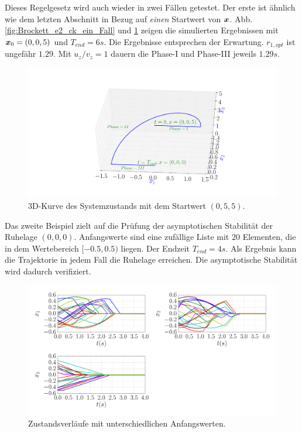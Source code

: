 Dieses Regelgesetz wird auch wieder in zwei Fällen getestet. Der erste ist ähnlich wie dem letzten Abschnitt in Bezug auf \emph{einen} Startwert von $\boldsymbol x$. Abb. \ref{fig:Brockett_e2_ck_ein_Fall} und \ref{fig:3d_Brockett_e2_ck} zeigen die simulierten Ergebnissen mit $\boldsymbol x_{0}=(0,0,5)$ und $T_{end}=6s$. Die Ergebnisse entsprechen der Erwartung. $r_{1,opt}$ ist ungefähr $1.29$. Mit $u_{z}/v_{z}=1$ dauern die Phase-I und Phase-III jeweils $1.29s$.
\begin{figure}[!h]
	\centering
	\includegraphics[width=0.8\linewidth]{bild/30_32/3d_Brockett_e2_ck.pdf}%
	\caption{3D-Kurve des Systemzustands mit dem Startwert $(0,5,5)$.}
	\label{fig:3d_Brockett_e2_ck}
\end{figure}

Das zweite Beispiel zielt auf die Prüfung der asymptotischen Stabilität der Ruhelage $(0,0,0)$. Anfangswerte sind eine zufällige Liste mit $20$ Elementen, die in dem Wertebereich $[-0.5,0.5)$ liegen. Der Endzeit $T_{end}=4s$. Als Ergebnis kann die Trajektorie in jedem Fall die Ruhelage erreichen. Die asymptotische Stabilität wird dadurch verifiziert.

\begin{figure}[!h]
	\centering
	\includegraphics[width=\linewidth]{bild/30_32/Brockett_e2_ck_x_Asy.pdf}%
	\caption{Zustandsverläufe mit unterschiedlichen Anfangswerten.}
	\label{fig:Brockett_e2_ck_x_Asy}
\end{figure}

